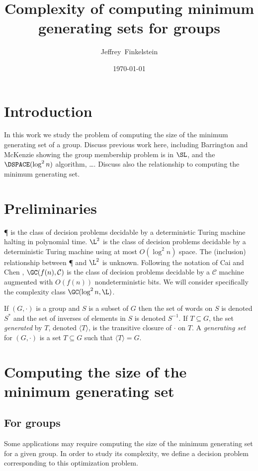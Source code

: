\documentclass{article}
\title{Complexity of computing minimum generating sets for groups}
\author{Jef{}frey~Finkelstein}
\date{\today}
\newcommand{\gen}[1]{{\langle #1 \rangle}}
\begin{document}
\maketitle

\section{Introduction}

In this work we study the problem of computing the size of the minimum generating set of a group.
Discuss previous work here, including Barrington and McKenzie showing the group membership problem is in $\SL$, and the $\DSPACE(\log^2 n)$ algorithm, \ldots.
Discuss also the relationship to computing the minimum generating set.

\section{Preliminaries}

\P{} is the class of decision problems decidable by a deterministic Turing machine halting in polynomial time.
$\L^2$ is the class of decision problems decidable by a deterministic Turing machine using at most $O(\log^2 n)$ space.
The (inclusion) relationship between \P{} and $\L^2$ is unknown.
Following the notation of Cai and Chen \cite{cc97}, $\GC(f(n), \mathcal{C})$ is the class of decision problems decidable by a $\mathcal{C}$ machine augmented with $O(f(n))$ nondeterministic bits.
We will consider specifically the complexity class $\GC(\log^2 n, \L)$.

If $(G, \cdot)$ is a group and $S$ is a subset of $G$ then the set of words on $S$ is denoted $S^*$ and the set of inverses of elements in $S$ is denoted $S^{-1}$.
If $T \subseteq G$, the set \emph{generated} by $T$, denoted $\gen{T}$, is the transitive closure of $\cdot$ on $T$.
A \emph{generating set} for $(G, \cdot)$ is a set $T \subseteq G$ such that $\gen{T} = G$.

\section{Computing the size of the minimum generating set}

\subsection{For groups}

Some applications may require computing the size of the minimum generating set for a given group.
In order to study its complexity, we define a decision problem corresponding to this optimization problem.
\end{document}
